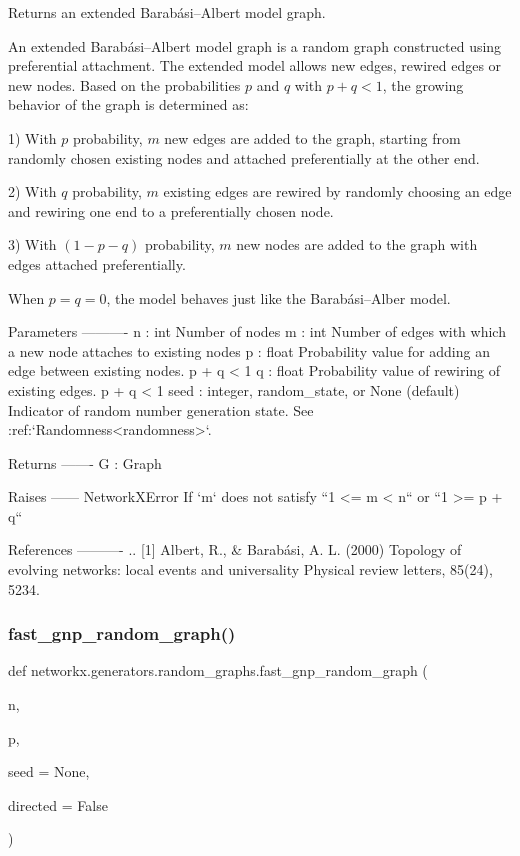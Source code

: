 \begin{DoxyVerb}Returns an extended Barabási–Albert model graph.

An extended Barabási–Albert model graph is a random graph constructed
using preferential attachment. The extended model allows new edges,
rewired edges or new nodes. Based on the probabilities $p$ and $q$
with $p + q < 1$, the growing behavior of the graph is determined as:

1) With $p$ probability, $m$ new edges are added to the graph,
starting from randomly chosen existing nodes and attached preferentially at the other end.

2) With $q$ probability, $m$ existing edges are rewired
by randomly choosing an edge and rewiring one end to a preferentially chosen node.

3) With $(1 - p - q)$ probability, $m$ new nodes are added to the graph
with edges attached preferentially.

When $p = q = 0$, the model behaves just like the Barabási–Alber model.

Parameters
----------
n : int
    Number of nodes
m : int
    Number of edges with which a new node attaches to existing nodes
p : float
    Probability value for adding an edge between existing nodes. p + q < 1
q : float
    Probability value of rewiring of existing edges. p + q < 1
seed : integer, random_state, or None (default)
    Indicator of random number generation state.
    See :ref:`Randomness<randomness>`.

Returns
-------
G : Graph

Raises
------
NetworkXError
    If `m` does not satisfy ``1 <= m < n`` or ``1 >= p + q``

References
----------
.. [1] Albert, R., & Barabási, A. L. (2000)
   Topology of evolving networks: local events and universality
   Physical review letters, 85(24), 5234.
\end{DoxyVerb}
 \mbox{\label{namespacenetworkx_1_1generators_1_1random__graphs_a5f6169d8b00ad425259665a725647da0}} 
\subsubsection{\texorpdfstring{fast\+\_\+gnp\+\_\+random\+\_\+graph()}{fast\_gnp\_random\_graph()}}
{\footnotesize\ttfamily def networkx.\+generators.\+random\+\_\+graphs.\+fast\+\_\+gnp\+\_\+random\+\_\+graph (\begin{DoxyParamCaption}\item[{}]{n,  }\item[{}]{p,  }\item[{}]{seed = {\ttfamily None},  }\item[{}]{directed = {\ttfamily False} }\end{DoxyParamCaption})}


